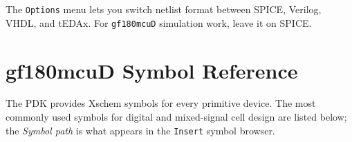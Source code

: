 \documentclass[11pt]{article}
\begin{document}
The \texttt{Options} menu lets you switch netlist format between SPICE,
Verilog, VHDL, and tEDAx.
For \texttt{gf180mcuD} simulation work, leave it on SPICE.

\section{gf180mcuD Symbol Reference}

The PDK provides Xschem symbols for every primitive device.
The most commonly used symbols for digital and mixed-signal cell design
are listed below; the \emph{Symbol path} is what appears in the
\texttt{Insert} symbol browser.
\end{document}
